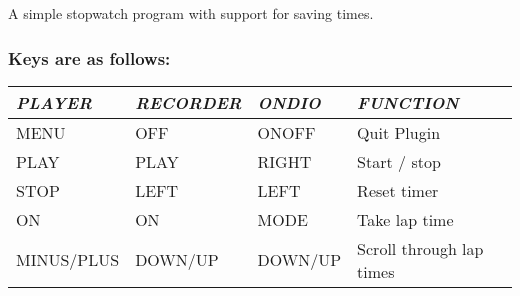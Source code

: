 A simple stopwatch program with support for saving times.

\subsubsection{Keys are as follows:}

\begin{tabular}[c]{|p{2.9029999cm}|p{2.763cm}|p{2.199cm}|p{5.235cm}|}
\hline
{\centering\bfseries\itshape
PLAYER 
\par}
&
{\centering\bfseries\itshape
RECORDER 
\par}
&
{\centering\bfseries\itshape
ONDIO 
\par}
&
{\centering\bfseries\itshape
FUNCTION 
\par}
\\\hline
{\centering
MENU 
\par}
&
{\centering
OFF 
\par}
&
{\centering
ONOFF 
\par}
&
Quit Plugin 
\\\hline
{\centering
PLAY 
\par}
&
{\centering
PLAY 
\par}
&
{\centering
RIGHT 
\par}
&
Start / stop 
\\\hline
{\centering
STOP 
\par}
&
{\centering
LEFT
\par}
&
{\centering
LEFT 
\par}
&
Reset timer 
\\\hline
{\centering
ON 
\par}
&
{\centering
ON 
\par}
&
{\centering
MODE 
\par}
&
Take lap time 
\\\hline
{\centering
MINUS/PLUS 
\par}
&
{\centering
DOWN/UP 
\par}
&
{\centering
DOWN/UP 
\par}
&
Scroll through lap times
\\\hline
\end{tabular}
